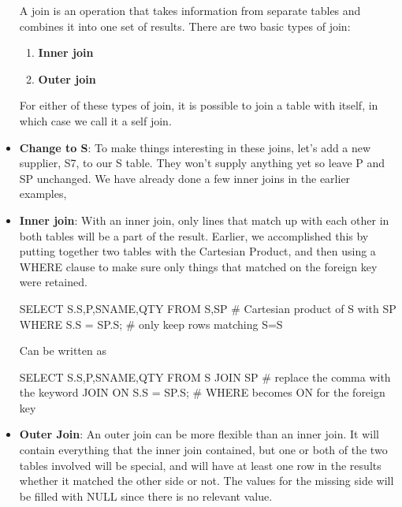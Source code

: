 \documentclass{report}
\begin{document}
\begin{itemize}
            \bigbreak \noindent 
            A join is an operation that takes information from separate tables and combines it into one set of results.
            \bigbreak \noindent 
            There are two basic types of join:
            \begin{enumerate}
                \item \textbf{Inner join}
                \item \textbf{Outer join}
            \end{enumerate}
            For either of these types of join, it is possible to join a table with itself, in which case we call it a self join.
        \item \textbf{Change to S}: To make things interesting in these joins, let's add a new supplier, S7, to our S table. They won't supply anything yet so leave P and SP unchanged.
            \bigbreak \noindent 
            We have already done a few inner joins in the earlier examples,
            \bigbreak \noindent 
        \item \textbf{Inner join}: With an inner join, only lines that match up with each other in both tables will be a part of the result. Earlier, we accomplished this by putting together two tables with the Cartesian Product, and then using a WHERE clause to make sure only things that matched on the foreign key were retained.
            \bigbreak \noindent 
            \begin{sqlcode}
                SELECT S.S,P,SNAME,QTY
                    FROM S,SP # Cartesian product of S with SP
                    WHERE S.S = SP.S; # only keep rows matching S=S
            \end{sqlcode}
            \bigbreak \noindent 
            Can be written as
            \bigbreak \noindent 
            \begin{sqlcode}
            SELECT S.S,P,SNAME,QTY
                FROM S JOIN SP # replace the comma with the keyword JOIN
                ON S.S = SP.S; # WHERE becomes ON for the foreign key
            \end{sqlcode}
        \item \textbf{Outer Join}: An outer join can be more flexible than an inner join. It will contain everything that the inner join contained, but one or both of the two tables involved will be special, and will have at least one row in the results whether it matched the other side or not. The values for the missing side will be filled with NULL since there is no relevant value.
            \bigbreak \noindent 

\end{itemize}
\end{document}

